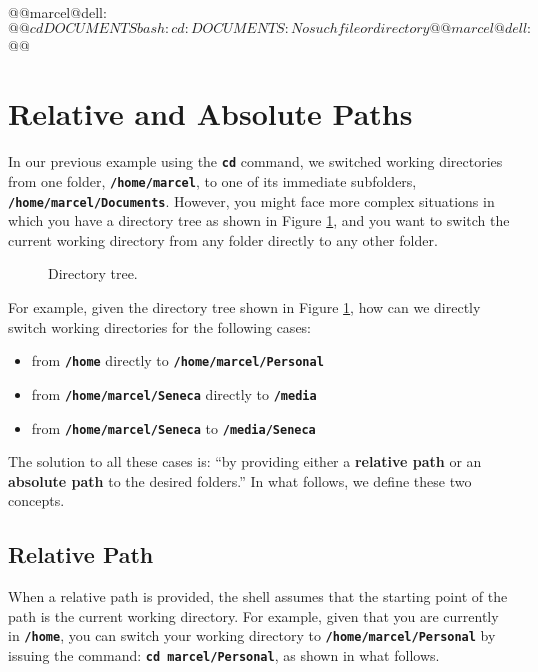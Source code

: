 \begin{command_line}[make]
@@marcel@dell:~$@@ cd DOCUMENTS
bash: cd: DOCUMENTS: No such file or directory
@@marcel@dell:~$@@
\end{command_line}

\section{Relative and Absolute Paths}

In our previous example using the \textbf{\texttt{cd}} command, we switched working directories from one folder, \textbf{\texttt{/home/marcel}}, to one of its immediate subfolders, \textbf{\texttt{/home/marcel/Documents}}. However, you might face more complex situations in which you have a directory tree as shown in Figure \ref{fig:ch2_dirtree}, and you want to switch the current working directory from any folder directly to any other folder.

\begin{figure}[!htbp]
  \centering
        
        \caption{Directory tree.}
        \label{fig:ch2_dirtree}
\end{figure}

For example, given the directory tree shown in Figure \ref{fig:ch2_dirtree}, how can we directly switch working directories for the following cases:
\begin{itemize}
\item from \textbf{\texttt{/home}} directly to \textbf{\texttt{/home/marcel/Personal}}
\item from \textbf{\texttt{/home/marcel/Seneca}} directly to \textbf{\texttt{/media}}
\item from \textbf{\texttt{/home/marcel/Seneca}} to \textbf{\texttt{/media/Seneca}}
\end{itemize}
The solution to all these cases is: ``by providing either a \textbf{relative path} or an \textbf{absolute path} to the desired folders.'' In what follows, we define these two concepts.

\subsection{Relative Path}
 When a relative path is provided, the shell assumes that the starting point of the path is the current working directory. For example, given that you are currently in \textbf{\texttt{/home}}, you can switch your working directory to \textbf{\texttt{/home/marcel/Personal}} by issuing the command: \textbf{\texttt{cd marcel/Personal}}, as shown in what follows.
